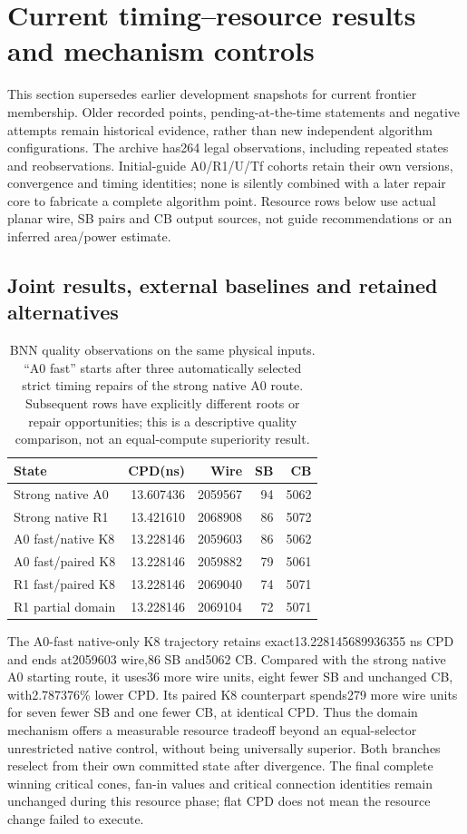 \section{Current timing--resource results and mechanism controls}
This section supersedes earlier development snapshots for current frontier membership. Older recorded points, pending-at-the-time statements and negative attempts remain historical evidence, rather than new independent algorithm configurations. The archive has264 legal observations, including repeated states and reobservations. Initial-guide A0/R1/U/Tf cohorts retain their own versions, convergence and timing identities; none is silently combined with a later repair core to fabricate a complete algorithm point. Resource rows below use actual planar wire, SB pairs and CB output sources, not guide recommendations or an inferred area/power estimate.

\subsection{Joint results, external baselines and retained alternatives}
\begin{table}[h]
\centering\caption{BNN quality observations on the same physical inputs. ``A0 fast'' starts after three automatically selected strict timing repairs of the strong native A0 route. Subsequent rows have explicitly different roots or repair opportunities; this is a descriptive quality comparison, not an equal-compute superiority result.}
\label{tab:current-joint-frontier}
\small
\begin{tabular}{lrrrr}\hline
State & CPD(ns) & Wire & SB & CB\\\hline
Strong native A0 &13.607436&2059567&94&5062\\
Strong native R1 &13.421610&2068908&86&5072\\
A0 fast/native K8 &13.228146&2059603&86&5062\\
A0 fast/paired K8 &13.228146&2059882&79&5061\\
R1 fast/paired K8 &13.228146&2069040&74&5071\\
R1 partial domain &13.228146&2069104&72&5071\\\hline
\end{tabular}
\end{table}
The A0-fast native-only K8 trajectory retains exact13.228145689936355 ns CPD and ends at2059603 wire,86 SB and5062 CB. Compared with the strong native A0 starting route, it uses36 more wire units, eight fewer SB and unchanged CB, with2.787376\% lower CPD. Its paired K8 counterpart spends279 more wire units for seven fewer SB and one fewer CB, at identical CPD. Thus the domain mechanism offers a measurable resource tradeoff beyond an equal-selector unrestricted native control, without being universally superior. Both branches reselect from their own committed state after divergence. The final complete winning critical cones, fan-in values and critical connection identities remain unchanged during this resource phase; flat CPD does not mean the resource change failed to execute.


